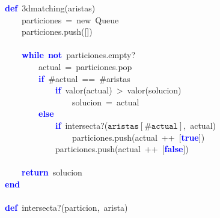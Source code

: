 \noindent
\mbox{}\textbf{\textcolor{Blue}{def}}\ 3dmatching\textcolor{BrickRed}{(}aristas\textcolor{BrickRed}{)} \\
\mbox{}\ \ \ \ particiones\ \textcolor{BrickRed}{=}\ new\ Queue \\
\mbox{}\ \ \ \ particiones\textcolor{BrickRed}{.}push\textcolor{BrickRed}{([])} \\
\mbox{} \\
\mbox{}\ \ \ \ \textbf{\textcolor{Blue}{while}}\ \textbf{\textcolor{Blue}{not}}\ particiones\textcolor{BrickRed}{.}empty? \\
\mbox{}\ \ \ \ \ \ \ \ actual\ \textcolor{BrickRed}{=}\ particiones\textcolor{BrickRed}{.}pop \\
\mbox{}\ \ \ \ \ \ \ \ \textbf{\textcolor{Blue}{if}}\ $\#$actual\ \textcolor{BrickRed}{==}\ $\#$aristas \\
\mbox{}\ \ \ \ \ \ \ \ \ \ \ \ \textbf{\textcolor{Blue}{if}}\ valor\textcolor{BrickRed}{(}actual\textcolor{BrickRed}{)}\ \textcolor{BrickRed}{\textgreater{}}\ valor\textcolor{BrickRed}{(}solucion\textcolor{BrickRed}{)} \\
\mbox{}\ \ \ \ \ \ \ \ \ \ \ \ \ \ \ \ solucion\ \textcolor{BrickRed}{=}\ actual \\
\mbox{}\ \ \ \ \ \ \ \ \textbf{\textcolor{Blue}{else}} \\
\mbox{}\ \ \ \ \ \ \ \ \ \ \ \ \textbf{\textcolor{Blue}{if}}\ intersecta?\textcolor{BrickRed}{(}$\mathtt{aristas[\#actual]}$\textcolor{BrickRed}{,}\ actual\textcolor{BrickRed}{)} \\
\mbox{}\ \ \ \ \ \ \ \ \ \ \ \ \ \ \ \ particiones\textcolor{BrickRed}{.}push\textcolor{BrickRed}{(}actual\ \textcolor{BrickRed}{++}\ \textcolor{BrickRed}{[}\textbf{\textcolor{Blue}{true}}\textcolor{BrickRed}{])} \\
\mbox{}\ \ \ \ \ \ \ \ \ \ \ \ particiones\textcolor{BrickRed}{.}push\textcolor{BrickRed}{(}actual\ \textcolor{BrickRed}{++}\ \textcolor{BrickRed}{[}\textbf{\textcolor{Blue}{false}}\textcolor{BrickRed}{])} \\
\mbox{} \\
\mbox{}\ \ \ \ \textbf{\textcolor{Blue}{return}}\ solucion \\
\mbox{}\textbf{\textcolor{Blue}{end}} \\
\mbox{} \\
\mbox{}\textbf{\textcolor{Blue}{def}}\ intersecta?\textcolor{BrickRed}{(}particion\textcolor{BrickRed}{,}\ arista\textcolor{BrickRed}{)} \\
